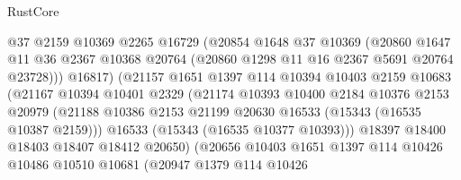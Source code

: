\begin{lexlean}{RustCore}
\begin{coremodule}
                              @37
                              @2159
                              @10369
                              @2265
                              @16729
                              (@20854
                                @1648
                                @37
                                @10369
                                (@20860
                                  @1647
                                  @11
                                  @36
                                  @2367
                                  @10368
                                  @20764
                                  (@20860 @1298 @11 @16 @2367 @5691 @20764 @23728)))
                              @16817)
                            (@21157
                              @1651
                              @1397
                              @114
                              @10394
                              @10403
                              @2159
                              @10683
                              (@21167
                                @10394
                                @10401
                                @2329
                                (@21174
                                  @10393
                                  @10400
                                  @2184
                                  @10376
                                  @2153
                                  @20979
                                  (@21188
                                    @10386
                                    @2153
                                    @21199
                                    @20630
                                    @16533
                                    (@15343 (@16535 @10387 @2159)))
                                  @16533
                                  (@15343 (@16535 @10377 @10393)))
                                @18397
                                @18400
                                @18403
                                @18407
                                @18412
                                @20650)
                              (@20656
                                @10403
                                @1651
                                @1397
                                @114
                                @10426
                                @10486
                                @10510
                                @10681
                                (@20947
                                  @1379
                                  @114
                                  @10426

\end{coremodule}
\end{lexlean}
